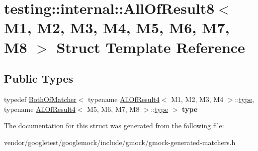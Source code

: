 \hypertarget{structtesting_1_1internal_1_1_all_of_result8}{}\section{testing\+:\+:internal\+:\+:All\+Of\+Result8$<$ M1, M2, M3, M4, M5, M6, M7, M8 $>$ Struct Template Reference}
\label{structtesting_1_1internal_1_1_all_of_result8}
\subsection*{Public Types}
\begin{DoxyCompactItemize}
\item 
\mbox{\label{structtesting_1_1internal_1_1_all_of_result8_a7103892a28c35221b9e62e871c577727}} 
typedef \hyperlink{classtesting_1_1internal_1_1_both_of_matcher}{Both\+Of\+Matcher}$<$ typename \hyperlink{structtesting_1_1internal_1_1_all_of_result4}{All\+Of\+Result4}$<$ M1, M2, M3, M4 $>$\+::\hyperlink{classtesting_1_1internal_1_1_both_of_matcher}{type}, typename \hyperlink{structtesting_1_1internal_1_1_all_of_result4}{All\+Of\+Result4}$<$ M5, M6, M7, M8 $>$\+::\hyperlink{classtesting_1_1internal_1_1_both_of_matcher}{type} $>$ {\bfseries type}
\end{DoxyCompactItemize}


The documentation for this struct was generated from the following file\+:\begin{DoxyCompactItemize}
\item 
vendor/googletest/googlemock/include/gmock/gmock-\/generated-\/matchers.\+h\end{DoxyCompactItemize}
